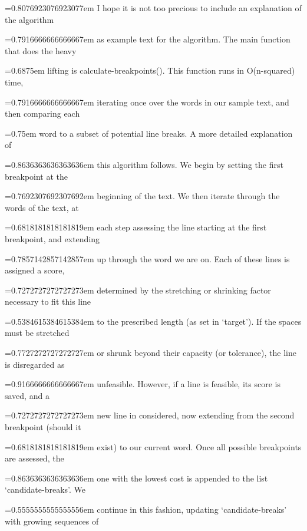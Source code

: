 \documentclass{article}
\begin{document}
 \font=0.8076923076923077em I hope it is not too precious to include an explanation of the algorithm 

 \font=0.7916666666666667em as example text for the algorithm. The main function that does the heavy 

 \font=0.6875em lifting is calculate-breakpoints(). This function runs in O(n-squared) time, 

 \font=0.7916666666666667em iterating once over the words in our sample text, and then comparing each 

 \font=0.75em word to a subset of potential line breaks. A more detailed explanation of 

 \font=0.8636363636363636em this algorithm follows. We begin by setting the first breakpoint at the 

 \font=0.7692307692307692em beginning of the text. We then iterate through the words of the text, at 

 \font=0.6818181818181819em each step assessing the line starting at the first breakpoint, and extending 

 \font=0.7857142857142857em up through the word we are on. Each of these lines is assigned a score, 

 \font=0.7272727272727273em determined by the stretching or shrinking factor necessary to fit this line 

 \font=0.5384615384615384em to the prescribed length (as set in `target'). If the spaces must be stretched 

 \font=0.7727272727272727em or shrunk beyond their capacity (or tolerance), the line is disregarded as 

 \font=0.9166666666666667em unfeasible. However, if a line is feasible, its score is saved, and a 

 \font=0.7272727272727273em new line in considered, now extending from the second breakpoint (should it 

 \font=0.6818181818181819em exist) to our current word. Once all possible breakpoints are assessed, the 

 \font=0.8636363636363636em one with the lowest cost is appended to the list `candidate-breaks'. We 

 \font=0.5555555555555556em continue in this fashion, updating `candidate-breaks' with growing sequences of 
\end{document}
